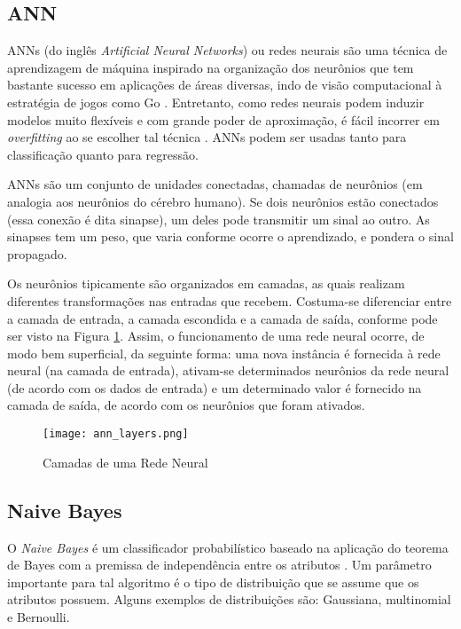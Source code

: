 \subsection{ANN}
ANNs (do inglês \textit{Artificial Neural Networks}) ou redes neurais são uma
técnica de aprendizagem de máquina inspirado na organização dos neurônios que tem
bastante sucesso em aplicações de áreas diversas, indo de visão computacional
\cite{ml_second_book} à estratégia de jogos como Go \cite{google_ann}. Entretanto, como
redes neurais podem induzir modelos muito flexíveis e com grande poder de aproximação,
é fácil incorrer em \textit{overfitting} ao se escolher tal técnica
\cite{ml_second_book}. ANNs podem ser usadas tanto para classificação quanto para
regressão. 
\par ANNs são um conjunto de unidades conectadas, chamadas de neurônios (em
analogia aos neurônios do cérebro humano). Se dois neurônios estão conectados (essa
conexão é dita sinapse), um
deles pode transmitir um sinal ao outro. As sinapses tem um peso, que varia conforme
ocorre o aprendizado, e pondera o sinal propagado. 
\par Os neurônios tipicamente são organizados em camadas, as quais realizam
diferentes transformações nas entradas que recebem. Costuma-se diferenciar entre a
camada de entrada, a camada escondida e a camada de saída, conforme pode ser visto na
Figura \ref{ann_layers}. Assim, o funcionamento de uma rede neural ocorre, de modo bem
superficial, da seguinte forma: uma nova instância é fornecida à rede
neural (na camada de entrada), ativam-se determinados neurônios da rede neural (de
acordo com os dados de entrada) e um determinado valor é fornecido na camada de
saída, de acordo com os neurônios que foram ativados.  

\begin{figure}[!ht]
    \centering
    \texttt{[image: ann\_layers.png]}
    \caption{Camadas de uma Rede Neural}
    \label{ann_layers}
\end{figure}

\subsection{Naive Bayes}
O \textit{Naive Bayes} é um classificador
probabilístico baseado na aplicação do teorema de Bayes com a premissa de
independência entre os atributos \cite{ml_book}. Um parâmetro importante para tal
algoritmo é o tipo de distribuição que se assume que os atributos possuem. Alguns
exemplos de distribuições são: Gaussiana, multinomial e Bernoulli. 

